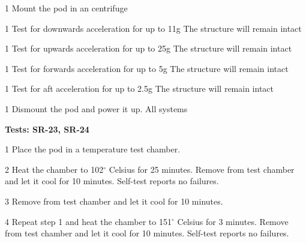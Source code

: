 \documentclass[Main]{subfiles}
\begin{document}
\begin{TestCase}
\TC
{1}
{Mount the pod in an centrifuge}
{}
{}

\TC
{1}
{Test for downwards acceleration for up to 11g}
{The structure will remain intact}
{}

\TC
{1}
{Test for upwards acceleration for up to 25g}
{The structure will remain intact}
{}

\TC
{1}
{Test for forwards acceleration for up to 5g}
{The structure will remain intact}
{}

\TC
{1}
{Test for aft acceleration for up to 2.5g}
{The structure will remain intact}
{}

\TC
{1}
{Dismount the pod and power it up.}
{All systems }
{}
\end{TestCase}


\textbf{Tests: SR-23, SR-24}


\begin{TestCaseIntro}
\end{TestCaseIntro}

\begin{TestCase}
\TC
{1}
{Place the pod in a temperature test chamber.}
{}
{}


\TC
{2}
{Heat the chamber to 102$^\circ$ Celsius for 25 minutes. 
Remove from test chamber and let it cool for 10 minutes.}
{Self-test reports no failures.}
{}


\TC
{3}
{Remove from test chamber and let it cool for 10 minutes.}
{}
{}

\TC
{4}
{Repeat step 1 and heat the chamber to 151$^\circ$ Celsius for 3 minutes. 
Remove from test chamber and let it cool for 10 minutes.}
{Self-test reports no failures.}
{}


\end{TestCase}
\end{document}
